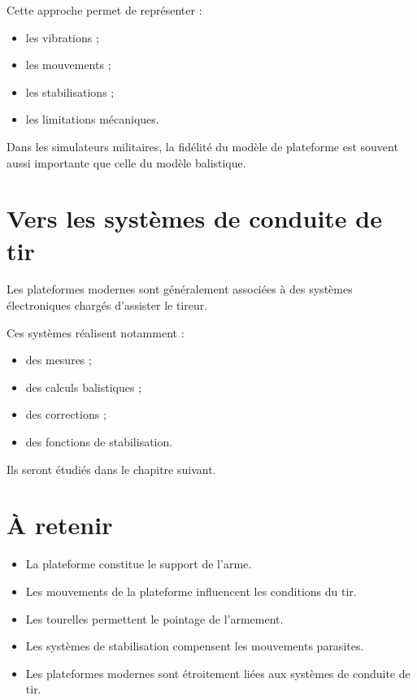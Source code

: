 Cette approche permet de représenter :

\begin{itemize}
    \item les vibrations ;
    \item les mouvements ;
    \item les stabilisations ;
    \item les limitations mécaniques.
\end{itemize}

\begin{simulation}

Dans les simulateurs militaires, la fidélité du modèle de plateforme est
souvent aussi importante que celle du modèle balistique.

\end{simulation}

\section{Vers les systèmes de conduite de tir}

Les plateformes modernes sont généralement associées à des systèmes
électroniques chargés d'assister le tireur.

Ces systèmes réalisent notamment :

\begin{itemize}
    \item des mesures ;
    \item des calculs balistiques ;
    \item des corrections ;
    \item des fonctions de stabilisation.
\end{itemize}

Ils seront étudiés dans le chapitre suivant.

\section{À retenir}

\begin{aretenir}

\begin{itemize}
    \item La plateforme constitue le support de l'arme.
    \item Les mouvements de la plateforme influencent les conditions du tir.
    \item Les tourelles permettent le pointage de l'armement.
    \item Les systèmes de stabilisation compensent les mouvements parasites.
    \item Les plateformes modernes sont étroitement liées aux systèmes de
    conduite de tir.
\end{itemize}

\end{aretenir}
